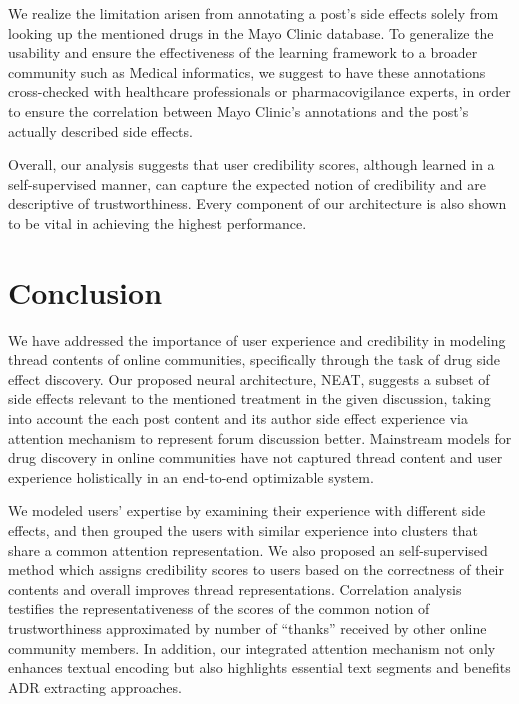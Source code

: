 \documentclass{bmcart}
\begin{document}
We realize the limitation arisen from annotating a post's side effects solely from looking up the mentioned drugs in the Mayo Clinic database. To generalize the usability and ensure the effectiveness of the learning framework to a broader community such as Medical informatics, we suggest to have these annotations cross-checked with healthcare professionals or pharmacovigilance experts, in order to ensure the correlation between Mayo Clinic's annotations and the post's actually described side effects.

Overall, our analysis suggests that user credibility scores, although learned in a self-supervised manner, can capture the expected notion of credibility and are descriptive of trustworthiness. Every component of our architecture is also shown to be vital in achieving the highest performance.

\section{Conclusion}\label{sec:conclusion}
We have addressed the importance of user experience and credibility in
modeling thread contents of online communities, specifically through
the task of drug side effect discovery. 
Our proposed neural architecture, NEAT, suggests a subset of side effects relevant to 
the mentioned treatment in the given discussion, 
taking into account the each post content and its
author side effect experience via attention mechanism to represent forum discussion better. Mainstream models for drug discovery in online communities have not captured thread content and user experience holistically in an end-to-end optimizable system.

We modeled users' expertise by examining their experience with different side effects, and then grouped the users with similar experience into clusters that
share a common attention representation. We also proposed an self-supervised method which assigns credibility scores to users based on the correctness of their contents and overall improves thread representations. Correlation analysis testifies the representativeness of the scores of the common notion of trustworthiness approximated by number of ``thanks'' received by other online community members. In addition, our integrated attention mechanism not only enhances textual encoding but also highlights essential text segments and benefits ADR extracting approaches.
\end{document}
